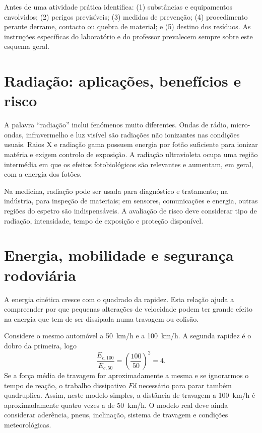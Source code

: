 \documentclass[11pt,a4paper,oneside]{book}
\begin{document}
\begin{metodo}[title=Mini-protocolo de emergência]
Antes de uma atividade prática identifica: (1) substâncias e equipamentos envolvidos; (2) perigos previsíveis; (3) medidas de prevenção; (4) procedimento perante derrame, contacto ou quebra de material; e (5) destino dos resíduos. As instruções específicas do laboratório e do professor prevalecem sempre sobre este esquema geral.
\end{metodo}

\section{Radiação: aplicações, benefícios e risco}
A palavra ``radiação'' inclui fenómenos muito diferentes. Ondas de rádio, micro-ondas, infravermelho e luz visível são radiações não ionizantes nas condições usuais. Raios X e radiação gama possuem energia por fotão suficiente para ionizar matéria e exigem controlo de exposição. A radiação ultravioleta ocupa uma região intermédia em que os efeitos fotobiológicos são relevantes e aumentam, em geral, com a energia dos fotões.

Na medicina, radiação pode ser usada para diagnóstico e tratamento; na indústria, para inspeção de materiais; em sensores, comunicações e energia, outras regiões do espetro são indispensáveis. A avaliação de risco deve considerar tipo de radiação, intensidade, tempo de exposição e proteção disponível.

\section{Energia, mobilidade e segurança rodoviária}
A energia cinética cresce com o quadrado da rapidez. Esta relação ajuda a compreender por que pequenas alterações de velocidade podem ter grande efeito na energia que tem de ser dissipada numa travagem ou colisão.

\begin{exemplo}[title=Exemplo resolvido -- rapidez e distância de travagem]
Considere o mesmo automóvel a \SI{50}{km/h} e a \SI{100}{km/h}. A segunda rapidez é o dobro da primeira, logo
\[
\frac{E_{c,100}}{E_{c,50}}=\left(\frac{100}{50}\right)^2=4.
\]
Se a força média de travagem for aproximadamente a mesma e se ignorarmos o tempo de reação, o trabalho dissipativo $F d$ necessário para parar também quadruplica. Assim, neste modelo simples, a distância de travagem a \SI{100}{km/h} é aproximadamente quatro vezes a de \SI{50}{km/h}. O modelo real deve ainda considerar aderência, pneus, inclinação, sistema de travagem e condições meteorológicas.
\end{exemplo}
\end{document}
